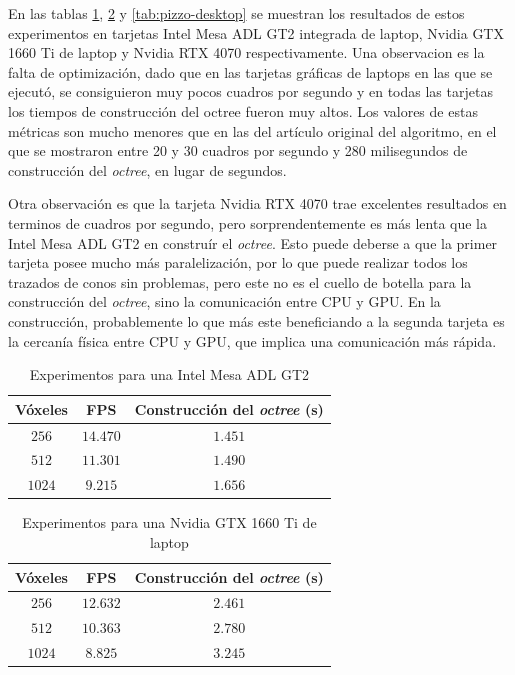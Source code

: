 En las tablas \ref{tab:cisco-laptop}, \ref{tab:pizzo-laptop} y \ref{tab:pizzo-desktop} se muestran los resultados de estos experimentos en tarjetas Intel Mesa ADL GT2 integrada de laptop, Nvidia GTX 1660 Ti de laptop y Nvidia RTX 4070 respectivamente.
Una observacion es la falta de optimización, dado que en las tarjetas gráficas de laptops en las que se ejecutó, se consiguieron muy pocos cuadros por segundo y en todas las tarjetas los tiempos de construcción del octree fueron muy altos.
Los valores de estas métricas son mucho menores que en las del artículo original del algoritmo, en el que se mostraron entre 20 y 30 cuadros por segundo y 280 milisegundos de construcción del \textit{octree}, en lugar de segundos.

Otra observación es que la tarjeta Nvidia RTX 4070 trae excelentes resultados en terminos de cuadros por segundo, pero sorprendentemente es más lenta que la Intel Mesa ADL GT2 en construír el \textit{octree}.
Esto puede deberse a que la primer tarjeta posee mucho más paralelización, por lo que puede realizar todos los trazados de conos sin problemas, pero este no es el cuello de botella para la construcción del \textit{octree}, sino la comunicación entre CPU y GPU.
En la construcción, probablemente lo que más este beneficiando a la segunda tarjeta es la cercanía física entre CPU y GPU, que implica una comunicación más rápida.

\begin{table}
\centering
\begin{tabular}{|c|c|c|}
	\hline
	\textbf{Vóxeles} & \textbf{FPS} & \textbf{Construcción del \textit{octree} (s)} \\
	\hline
	$256$ & $14.470$ & $1.451$ \\
	\hline
	$512$ & $11.301$ & $1.490$ \\
	\hline
	$1024$ & $9.215$ & $1.656$ \\
	\hline
\end{tabular}
\caption{Experimentos para una Intel Mesa ADL GT2}
\label{tab:cisco-laptop}
\end{table}

\begin{table}
\centering
\begin{tabular}{|c|c|c|}
	\hline
	\textbf{Vóxeles} & \textbf{FPS} & \textbf{Construcción del \textit{octree} (s)} \\
	\hline
	$256$ & $12.632$ & $2.461$ \\
	\hline
	$512$ & $10.363$ & $2.780$ \\
	\hline
	$1024$ & $8.825$ & $3.245$ \\
	\hline
\end{tabular}
\caption{Experimentos para una Nvidia GTX 1660 Ti de laptop}
\label{tab:pizzo-laptop}
\end{table}

